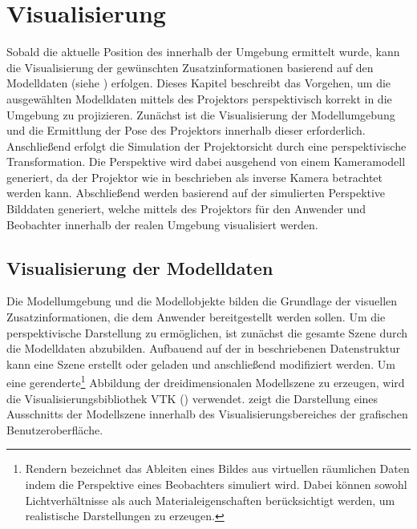 \chapter{Visualisierung}
\label{chap.vis}

\prever{
}

Sobald die aktuelle Position des  innerhalb der Umgebung ermittelt wurde, kann die Visualisierung der gewünschten Zusatzinformationen basierend auf den Modelldaten (siehe ) erfolgen. Dieses Kapitel beschreibt das Vorgehen, um die ausgewählten Modelldaten mittels des Projektors perspektivisch korrekt in die Umgebung zu projizieren. Zunächst ist die Visualisierung der Modellumgebung und die Ermittlung der Pose des Projektors innerhalb dieser erforderlich. Anschließend erfolgt die Simulation der Projektorsicht durch eine perspektivische Transformation. Die Perspektive wird dabei ausgehend von einem Kameramodell generiert, da der Projektor wie in  beschrieben als inverse Kamera betrachtet werden kann. Abschließend werden basierend auf der simulierten Perspektive Bilddaten generiert, welche mittels des Projektors für den Anwender und Beobachter innerhalb der realen Umgebung visualisiert werden.

\section{Visualisierung der Modelldaten}
Die Modellumgebung und die Modellobjekte bilden die Grundlage der visuellen Zusatzinformationen, die dem Anwender bereitgestellt werden sollen. Um die perspektivische Darstellung zu ermöglichen, ist zunächst die gesamte Szene durch die Modelldaten abzubilden. Aufbauend auf der in  beschriebenen Datenstruktur kann eine Szene erstellt oder geladen und anschließend modifiziert werden. Um eine gerenderte\footnote{Rendern bezeichnet das Ableiten eines Bildes aus virtuellen räumlichen Daten indem die Perspektive eines Beobachters simuliert wird. Dabei können sowohl Lichtverhältnisse als auch Materialeigenschaften berücksichtigt werden, um realistische Darstellungen zu erzeugen.} Abbildung der dreidimensionalen Modellszene zu erzeugen, wird die Visualisierungsbibliothek VTK () verwendet.  zeigt die Darstellung eines Ausschnitts der Modellszene innerhalb des Visualisierungsbereiches der grafischen Benutzeroberfläche.\\

